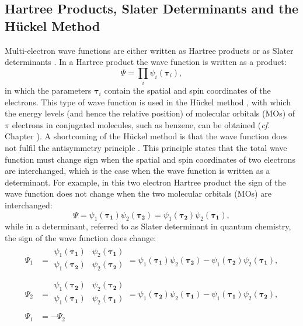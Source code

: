 \subsection{Hartree Products, Slater Determinants and the H\"{u}ckel Method}

Multi-electron wave functions are either written as Hartree products \cite{hartree1,hartree2,hartree3} or as Slater determinants \cite{slater}. In a Hartree product the wave function is written as a product:
\begin{equation}
\Psi=\prod_i \psi_i(\mathbf{\tau}_i),
\end{equation}
in which the parameters $\mathbf{\tau}_i$ contain the spatial and spin coordinates of the electrons. This type of wave function is used in the H\"uckel method \cite{huckel1,huckel2,huckel3}, with which the energy levels (and hence the relative position) of molecular orbitals (MOs) of $\pi$ electrons in conjugated molecules, such as benzene, can be obtained (\textit{cf.} Chapter \chhuckel). A shortcoming of the H\"uckel method is that the wave function does not fulfil the antisymmetry principle \cite{atkins}. This principle states that the total wave function must change sign when the spatial and spin coordinates of two electrons are interchanged, which is the case when the wave function is written as a determinant. For example, in this two electron Hartree product the sign of the wave function does not change when the two molecular orbitals (MOs) are interchanged:
\begin{equation}
\Psi=\psi_1(\mathbf{\tau_1})\psi_2(\mathbf{\tau_2}) = \psi_1(\mathbf{\tau_2})\psi_2(\mathbf{\tau_1}),
\end{equation}
while in a determinant, referred to as Slater determinant in quantum chemistry, the sign of the wave function does change:
\begin{equation}
\begin{split}
\Psi_1 &=
\begin{array}{|cc|}
\psi_1(\mathbf{\tau_1}) & \psi_2(\mathbf{\tau_1}) \\
\psi_1(\mathbf{\tau_2}) & \psi_2(\mathbf{\tau_2}) \\
\end{array}
= \psi_1(\mathbf{\tau_1})\psi_2(\mathbf{\tau_2}) - \psi_1(\mathbf{\tau_2})\psi_2(\mathbf{\tau_1}), \\
\Psi_2 &=
\begin{array}{|cc|}
\psi_1(\mathbf{\tau_2}) & \psi_2(\mathbf{\tau_2}) \\
\psi_1(\mathbf{\tau_1}) & \psi_2(\mathbf{\tau_1}) \\
\end{array}
= \psi_1(\mathbf{\tau_2})\psi_2(\mathbf{\tau_1}) - \psi_1(\mathbf{\tau_1})\psi_2(\mathbf{\tau_2}), \\
\Psi_1 &= - \Psi_2
\end{split}
\label{ch1.eq.slater}
\end{equation}
